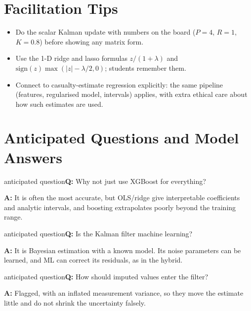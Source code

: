 \documentclass[11pt]{article}
\begin{document}
\section{Facilitation Tips}\begin{itemize}\item Do the scalar Kalman update with numbers on the board ($P=4$, $R=1$, $K=0.8$) before showing any matrix form.\item Use the 1-D ridge and lasso formulas $z/(1+\lambda)$ and $\mathrm{sign}(z)\max(|z|-\lambda/2,0)$; students remember them.\item Connect to casualty-estimate regression explicitly: the same pipeline (features, regularised model, intervals) applies, with extra ethical care about how such estimates are used.\end{itemize}

\section{Anticipated Questions and Model Answers}

\begin{question}{anticipated question}\textbf{Q:} Why not just use XGBoost for everything?\par\smallskip\textbf{A:} It is often the most accurate, but OLS/ridge give interpretable coefficients and analytic intervals, and boosting extrapolates poorly beyond the training range.\end{question}

\begin{question}{anticipated question}\textbf{Q:} Is the Kalman filter machine learning?\par\smallskip\textbf{A:} It is Bayesian estimation with a known model. Its noise parameters can be learned, and ML can correct its residuals, as in the hybrid.\end{question}

\begin{question}{anticipated question}\textbf{Q:} How should imputed values enter the filter?\par\smallskip\textbf{A:} Flagged, with an inflated measurement variance, so they move the estimate little and do not shrink the uncertainty falsely.\end{question}
\end{document}
